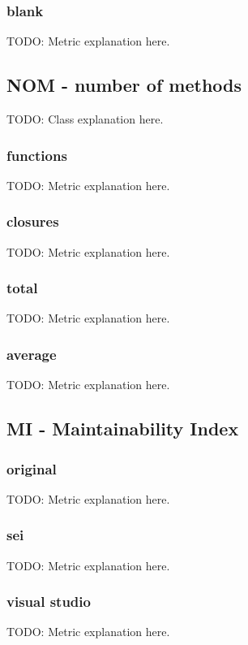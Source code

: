 \subsubsection{blank}
TODO: Metric explanation here.

\subsection{NOM - number of methods}

TODO: Class explanation here.

\subsubsection{functions}
TODO: Metric explanation here.

\subsubsection{closures}
TODO: Metric explanation here.

\subsubsection{total}
TODO: Metric explanation here.

\subsubsection{average}
TODO: Metric explanation here.

\subsection{MI - Maintainability Index}

\subsubsection{original}
TODO: Metric explanation here.

\subsubsection{sei}
TODO: Metric explanation here.

\subsubsection{visual studio}
TODO: Metric explanation here.
